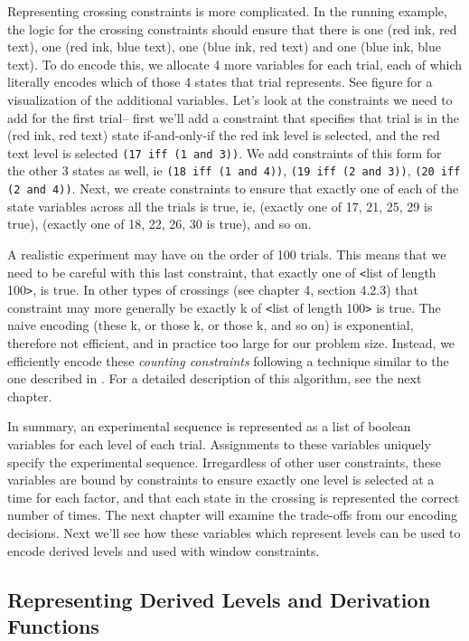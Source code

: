 Representing crossing constraints is more complicated. In the running example, the logic for the crossing constraints should ensure that there is one (red ink, red text), one (red ink, blue text), one (blue ink, red text) and one (blue ink, blue text). To do encode this, we allocate 4 more variables for each trial, each of which literally encodes which of those 4 states that trial represents. See figure  for a visualization of the additional variables. Let's look at the constraints we need to add for the first trial-- first we'll add a constraint that specifies that trial is in the (red ink, red text) state if-and-only-if the red ink level is selected, and the red text level is selected \texttt{(17 iff (1 and 3))}. We add constraints of this form for the other 3 states as well, ie \texttt{(18 iff (1 and 4))}, \texttt{(19 iff (2 and 3))}, \texttt{(20 iff (2 and 4))}. Next, we create constraints to ensure that exactly one of each of the state variables across all the trials is true, ie, (exactly one of 17, 21, 25, 29 is true), (exactly one of 18, 22, 26, 30 is true), and so on.

A realistic experiment may have on the order of 100 trials. This means that we need to be careful with this last constraint, that exactly one of \texttt{<}list of length 100\texttt{>}, is true. In other types of crossings (see chapter 4, section 4.2.3) that constraint may more generally be exactly k of \texttt{<}list of length 100\texttt{>} is true. The naive encoding (these k, or those k, or those k, and so on) is exponential, therefore not efficient, and in practice too large for our problem size. Instead, we efficiently encode these \emph{counting constraints} following a technique similar to the one described in \cite{sinz2005towards}. For a detailed description of this algorithm, see the next chapter.

In summary, an experimental sequence is represented as a list of boolean variables for each level of each trial. Assignments to these variables uniquely specify the experimental sequence. Irregardless of other user constraints, these variables are bound by constraints to ensure exactly one level is selected at a time for each factor, and that each state in the crossing is represented the correct number of times. The next chapter will examine the trade-offs from our encoding decisions. Next we'll see how these variables which represent levels can be used to encode derived levels and used with window constraints.

\subsection{Representing Derived Levels and Derivation Functions}

